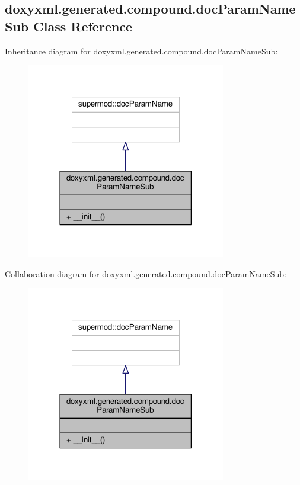 \subsection{doxyxml.\+generated.\+compound.\+doc\+Param\+Name\+Sub Class Reference}
\label{classdoxyxml_1_1generated_1_1compound_1_1docParamNameSub}


Inheritance diagram for doxyxml.\+generated.\+compound.\+doc\+Param\+Name\+Sub\+:
\nopagebreak
\begin{figure}[H]
\begin{center}
\leavevmode
\includegraphics[width=246pt]{d3/d81/classdoxyxml_1_1generated_1_1compound_1_1docParamNameSub__inherit__graph}
\end{center}
\end{figure}


Collaboration diagram for doxyxml.\+generated.\+compound.\+doc\+Param\+Name\+Sub\+:
\nopagebreak
\begin{figure}[H]
\begin{center}
\leavevmode
\includegraphics[width=246pt]{d6/d45/classdoxyxml_1_1generated_1_1compound_1_1docParamNameSub__coll__graph}
\end{center}
\end{figure}
